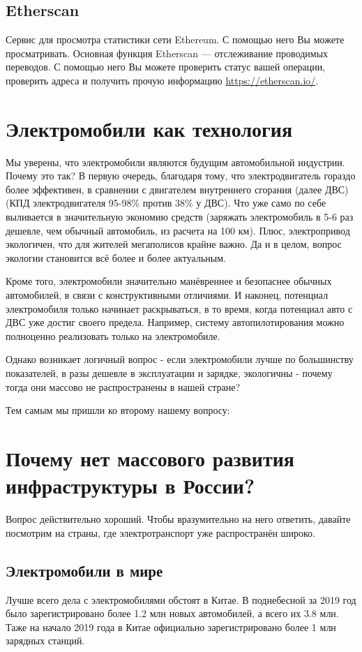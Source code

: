 \documentclass[a4paper,12pt]{report}
\begin{document}
\section{Etherscan}
Сервис для просмотра статистики сети Ethereum. С помощью него Вы можете просматривать. Основная функция Etherscan — отслеживание проводимых переводов. С помощью него Вы можете проверить статус вашей операции, проверить адреса и получить прочую информацию  \href{https://etherscan.io/}{https://etherscan.io/}.


\chapter{Электромобили как технология}
\label{chapter3}
Мы уверены, что электромобили являются будущим автомобильной индустрии. Почему это так? 
В первую очередь, благодаря тому, что электродвигатель гораздо более эффективен, в сравнении с двигателем внутреннего сгорания (далее ДВС) (КПД электродвигателя 95-98\% против 38\% у ДВС). Что уже само по себе выливается в значительную экономию средств (заряжать электромобиль в 5-6 раз дешевле, чем обычный автомобиль, из расчета на 100 км). Плюс, электропривод экологичен, что для жителей мегаполисов крайне важно. Да и в целом, вопрос экологии становится всё более и более актуальным. 

Кроме того, электромобили значительно манёвреннее и безопаснее обычных автомобилей, в связи с конструктивными отличиями. И наконец, потенциал электромобиля только начинает раскрываться, в то время, когда потенциал авто с ДВС уже достиг своего предела. Например, систему автопилотирования можно полноценно реализовать только на электромобиле.

Однако возникает логичный вопрос - если электромобили лучше по большинству показателей, в разы дешевле в эксплуатации и зарядке, экологичны - почему тогда они массово не распространены в нашей стране? 

Тем самым мы пришли ко второму нашему вопросу:


\chapter{Почему нет массового развития инфраструктуры в России?}
Вопрос действительно хороший. Чтобы вразумительно на него ответить, давайте посмотрим на страны, где электротранспорт уже распространён широко. 

\section{Электромобили в мире}
Лучше всего дела с электромобилями обстоят в Китае. В поднебесной за 2019 год было зарегистрировано более 1.2 млн новых автомобилей, а всего их 3.8 млн. Таже на начало 2019 года в Китае официально зарегистрировано более 1 млн зарядных станций.
\end{document}
